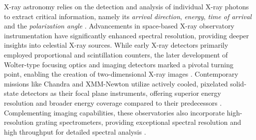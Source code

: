         	X-ray astronomy relies on the detection and analysis of individual X-ray photons to extract critical information, namely its \emph{arrival direction}, \emph{energy}, \emph{time of arrival} and the \emph{polarization angle} \cite{overviewXrays}. Advancements in space-based X-ray observatory instrumentation have significantly enhanced spectral resolution, providing deeper insights into celestial X-ray sources. While early X-ray detectors primarily employed proportional and scintillation counters, the later development of Wolter-type focusing optics and imaging detectors marked a pivotal turning point, enabling the creation of two-dimensional X-ray images \cite{giacconi1962evidence}. Contemporary missions like Chandra and XMM-Newton utilize actively cooled, pixelated solid-state detectors as their focal plane instruments, offering superior energy resolution and broader energy coverage compared to their predecessors \cite{jansen2001xmm,weisskopf2000chandra}. Complementing imaging capabilities, these observatories also incorporate high-resolution grating spectrometers, providing exceptional spectral resolution and high throughput for detailed spectral analysis \cite{bhattacharya2017supersoft}.
        
